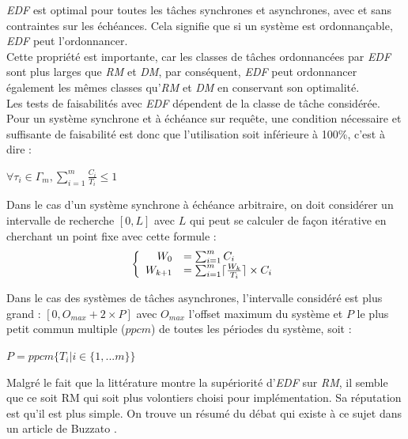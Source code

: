 \documentclass[11pt,a4paper,oneside]{report}
\begin{document}
\textit{EDF} est optimal pour toutes les tâches synchrones et asynchrones, avec et sans 
contraintes sur les échéances. 
Cela signifie que si un système est ordonnançable, \textit{EDF} peut l'ordonnancer.\\
Cette propriété est importante, car les classes de tâches ordonnancées par \textit{EDF} 
sont plus larges que \textit{RM} et \textit{DM}, par conséquent, \textit{EDF} peut ordonnancer également les 
mêmes classes qu'\textit{RM} et \textit{DM} en conservant son optimalité. \\

Les tests de faisabilités avec \textit{EDF} dépendent de la classe de tâche considérée. 
Pour un système synchrone et à échéance sur requête, 
une condition nécessaire et suffisante de faisabilité est donc que l'utilisation soit inférieure 
à 100\%, c'est à dire : \\
\begin{center}
	$\forall \tau_i \in \Gamma_m, \sum_{i=1}^{m}\frac{C_i}{T_i} \leq 1 $
\end{center}

Dans le cas d'un système synchrone à échéance arbitraire, on doit considérer un intervalle de 
recherche $[0, L]$ avec $L$ qui peut se calculer de façon itérative en cherchant un point fixe 
avec cette formule : \\
\[
\left \{
\begin{array}{r l}
W_0 &= \sum_{i = 1}^{m}C_i\\
W_{k+1} & =\sum_{i = 1}^{m} \lceil \frac{W_k}{T_i} \rceil \times C_i
\end{array}
\right.
\]

Dans le cas des systèmes de tâches asynchrones, l'intervalle considéré est plus grand : 
$[0, O_{max} + 2 \times P]$ avec $O_{max}$ l'offset maximum du système et 
$P$ le plus petit commun multiple ($ppcm$) de toutes les périodes du système, soit : \\
\begin{center}
	$P = ppcm\{T_i | i \in \{1, ... m\}\}$
\end{center}

Malgré le fait que la littérature montre la supériorité d'\textit{EDF} sur \textit{RM}, 
il semble que ce soit RM qui soit plus volontiers choisi pour implémentation. 
Sa réputation est qu'il est plus simple. 
On trouve un résumé du débat qui existe à ce sujet dans un article de Buzzato
\cite{buttazzo_rate_2005}.
\end{document}
